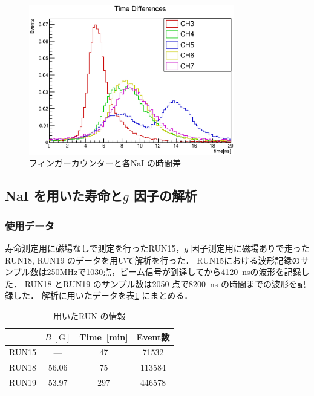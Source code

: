 \begin{figure}[hbt]
\centering
\includegraphics[width=0.8\textwidth]{figure/hatano/coincidence.eps}
\caption{フィンガーカウンターと各NaI の時間差}
\label{hatano_fig:coincidence}
\end{figure}


\subsection{NaI を用いた寿命と$g$ 因子の解析}
\subsubsection{使用データ}
寿命測定用に磁場なしで測定を行ったRUN15，$g$ 因子測定用に磁場ありで走ったRUN18, RUN19 のデータを用いて解析を行った．
RUN15における波形記録のサンプル数は250MHzで1030点，ビーム信号が到達してから4120~nsの波形を記録した．
RUN18 とRUN19 のサンプル数は2050 点で8200~ns の時間までの波形を記録した．
解析に用いたデータを表\ref{tab:RUN_info} にまとめる．

\begin{table}[H]%
\caption{用いたRUN の情報}
\centering
\begin{tabular}{cccc}\toprule
{} & $B~[\mathrm{G}]$ & Time~[min] & Event数\\ \midrule
RUN15 & --- & 47 & 71532 \\
RUN18 & 56.06 & 75 & 113584 \\
RUN19 & 53.97 & 297 & 446578 \\ \bottomrule
\end{tabular}
\label{tab:RUN_info}
\end{table}

